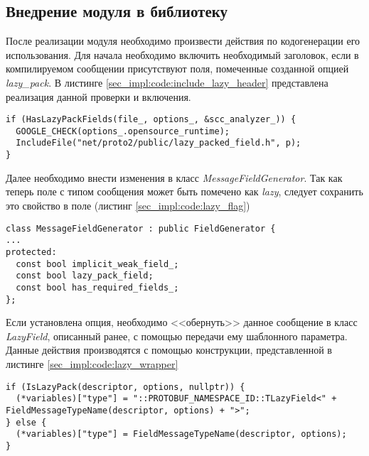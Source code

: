 \subsection{Внедрение модуля в библиотеку}

После реализации модуля необходимо произвести действия по кодогенерации его использования.
Для начала необходимо включить необходимый заголовок, если в компилируемом сообщении присутствуют поля, помеченные созданной опцией \textit{lazy\_pack}.
В листинге \ref{sec_impl:code:include_lazy_header} представлена реализация данной проверки и включения.

\begin{lstlisting}[style=CodeListing, label=sec_impl:code:include_lazy_header, caption={Включение заголовочного файла, если есть поля, помеченные опцией lazy\_pack}]
if (HasLazyPackFields(file_, options_, &scc_analyzer_)) {
  GOOGLE_CHECK(options_.opensource_runtime);
  IncludeFile("net/proto2/public/lazy_packed_field.h", p);
}
\end{lstlisting}

Далее необходимо внести изменения в класс \textit{MessageFieldGenerator}. 
Так как теперь поле с типом сообщения может быть помечено как \textit{lazy}, следует сохранить это свойство в поле (листинг \ref{sec_impl:code:lazy_flag})

\begin{lstlisting}[style=CodeListing, label=sec_impl:code:lazy_flag, caption={Добавление поля, сигнализируещего о наличии опции, отвечающей за ленивую десериализацию}]
class MessageFieldGenerator : public FieldGenerator {
...
protected:
  const bool implicit_weak_field_;
  const bool lazy_pack_field;
  const bool has_required_fields_;
};
\end{lstlisting}

Если установлена опция, необходимо <<обернуть>> данное сообщение в класс \textit{LazyField}, описанный ранее, с помощью передачи ему шаблонного параметра.
Данные действия производятся с помощью конструкции, представленной в листинге \ref{sec_impl:code:lazy_wrapper}

\begin{lstlisting}[style=CodeListing, label=sec_impl:code:lazy_wrapper, caption={Использование класса TLazyField в кодогенерации}]
if (IsLazyPack(descriptor, options, nullptr)) {
  (*variables)["type"] = "::PROTOBUF_NAMESPACE_ID::TLazyField<" + FieldMessageTypeName(descriptor, options) + ">";
} else {
  (*variables)["type"] = FieldMessageTypeName(descriptor, options);
}
\end{lstlisting}
